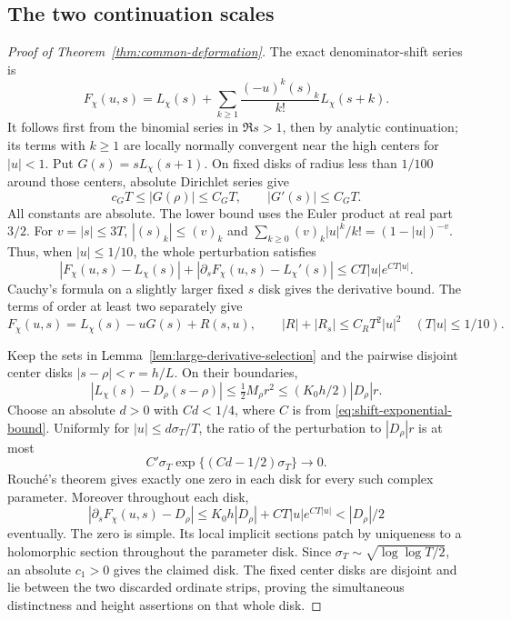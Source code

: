 \subsection{The two continuation scales}
\begin{proof}[Proof of Theorem~\ref{thm:common-deformation}]
The exact denominator-shift series is
\[
 F_\chi(u,s)=L_\chi(s)+
        \sum_{k\ge1}\frac{(-u)^k(s)_k}{k!}L_\chi(s+k).
\]
It follows first from the binomial series in $\Re s>1$, then by
analytic continuation; its terms with $k\ge1$ are locally normally
convergent near the high centers for $|u|<1$.
Put $G(s)=sL_\chi(s+1)$. On fixed disks of radius less than $1/100$
around those centers, absolute Dirichlet series give
\[
 c_GT\le|G(\rho)|\le C_GT,\qquad |G'(s)|\le C_GT.
\]
All constants are absolute. The lower bound uses the Euler product
at real part $3/2$. For $v=|s|\le3T$,
$|(s)_k|\le(v)_k$ and
$\sum_{k\ge0}(v)_k|u|^k/k!=(1-|u|)^{-v}$.
Thus, when $|u|\le1/10$, the whole perturbation satisfies
\begin{equation}\label{eq:shift-exponential-bound}
 |F_\chi(u,s)-L_\chi(s)|+
       |\partial_sF_\chi(u,s)-L_\chi'(s)|
       \le C T|u|e^{C T|u|}.
\end{equation}
Cauchy's formula on a slightly larger fixed $s$ disk gives the
derivative bound. The terms of order at least two separately give
\begin{equation}\label{eq:shift-quadratic-bound}
 F_\chi(u,s)=L_\chi(s)-uG(s)+R(s,u),\qquad
 |R|+|R_s|\le C_RT^2|u|^2
       \quad(T|u|\le1/10).
\end{equation}

Keep the sets in Lemma~\ref{lem:large-derivative-selection} and the
pairwise disjoint center disks $|s-\rho|<r=h/L$.
On their boundaries,
\[
 |L_\chi(s)-D_\rho(s-\rho)|
       \le\tfrac12M_\rho r^2\le(K_0h/2)|D_\rho|r.
\]
Choose an absolute $d>0$ with $Cd<1/4$, where $C$ is from
\eqref{eq:shift-exponential-bound}. Uniformly for $|u|\le d\sigma_T/T$,
the ratio of the perturbation to $|D_\rho|r$ is at most
\[
 C'\sigma_T\exp\{(Cd-1/2)\sigma_T\}\longrightarrow0.
\]
Rouch\'e's theorem gives exactly one zero in each disk for every
such complex parameter. Moreover throughout each disk,
\[
 |\partial_sF_\chi(u,s)-D_\rho|
 \le K_0h|D_\rho|+CT|u|e^{CT|u|}<|D_\rho|/2
\]
eventually. The zero is simple. Its local implicit sections patch by
uniqueness to a holomorphic section throughout the parameter disk.
Since $\sigma_T\sim\sqrt{\log\log T/2}$, an absolute $c_1>0$
gives the claimed disk. The fixed center disks are disjoint and lie
between the two discarded ordinate strips, proving the simultaneous
distinctness and height assertions on that whole disk.


\end{proof}
